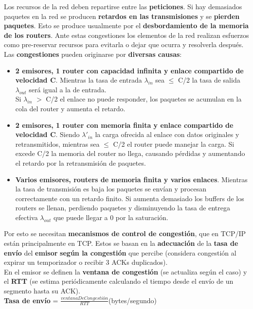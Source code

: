 \documentclass{article}
\begin{document}
Los recursos de la red deben repartirse entre las \textbf{peticiones}. Si hay demasiados paquetes en la red se producen \textbf{retardos en las transmisiones} y se \textbf{pierden paquetes}. Esto se produce usualmente por el \textbf{desbordamiento de la memoria de los routers}. Ante estas congestiones los elementos de la red realizan esfuerzos como pre-reservar recursos para evitarla o dejar que ocurra y resolverla después. \\
Las \textbf{congestiones} pueden originarse por \textbf{diversas causas}: 
\begin{itemize}
    \item \textbf{2 emisores, 1 router con capacidad infinita y enlace compartido de velocidad C}. Mientras la tasa de entrada $\lambda_{in}$ sea $\leq$ C/2 la tasa de salida $\lambda_{out}$ será igual a la de entrada. \\
    Si $\lambda_{in}$ $>$ C/2 el enlace no puede responder, los paquetes se acumulan en la cola del router y aumenta el retardo.

    \item \textbf{2 emisores, 1 router con memoria finita y enlace compartido de velocidad C}. Siendo $\lambda'_{in}$ la carga ofrecida al enlace con datos originales y retransmitidos, mientras sea $\leq$ C/2 el router puede manejar la carga. Si excede C/2 la memoria del router no llega, causando pérdidas y aumentando el retardo por la retransmisión de paquetes.

    \item \textbf{Varios emisores, routers de memoria finita y varios enlaces}. Mientras la tasa de transmisión es baja los paquetes se envían y procesan correctamente con un retardo finito. Si aumenta demasiado los buffers de los routers se llenan, perdiendo paquetes y disminuyendo la tasa de entrega efectiva $\lambda_{out}$ que puede llegar a 0 por la saturación.
    
\end{itemize}

Por esto se necesitan \textbf{mecanismos de control de congestión}, que en TCP/IP están principalmente en TCP. Estos se basan en la \textbf{adecuación} de la \textbf{tasa de envío} del \textbf{emisor} \textbf{según la congestión} que percibe (considera congestión al expirar un temporizador o recibir 3 ACKs duplicados). \\
En el emisor se definen la \textbf{ventana de congestión} (se actualiza según el caso) y el \textbf{RTT} (se estima periódicamente calculando el tiempo desde el envío de un segmento hasta su ACK). \\
\textbf{Tasa de envío} = $\frac{ventana De Congestión}{RTT}$(bytes/segundo) \\
\end{document}
